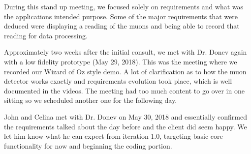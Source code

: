 \documentclass[11pt,a4paper]{article}
\begin{document}
During this stand up meeting, we focused solely on requirements and what was the applications intended purpose. Some of the major requirements that were deduced were displaying a reading of the muons and being able to record that reading for data processing.

Approximately two weeks after the initial consult, we met with Dr. Donev again with a low fidelity prototype (May 29, 2018). This was the meeting where we recorded our Wizard of Oz style demo. A lot of clarification as to how the muon detector works exactly and requirements evolution took place, which is well documented in the videos. The meeting had too much content to go over in one sitting so we scheduled another one for the following day. 

John and Celina met with Dr. Donev on May 30, 2018 and essentially confirmed the requirements talked about the day before and the client did seem happy. We let him know what he can expect from iteration 1.0, targeting basic core functionality for now and beginning the coding portion. 
\end{document}
